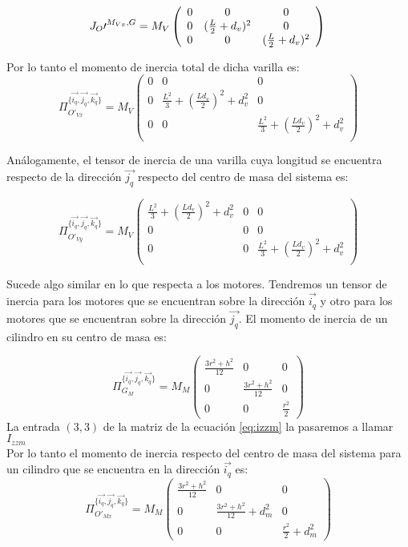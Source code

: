 $$
J_O\prime^{M_{Vx},G}= M_V \left(\begin{array}{ccc}
0  &0&  0\\
0  & (\frac{L}{2}+d_v)^2 & 0\\
0  &0 & (\frac{L}{2}+d_v)^2  \\
\end{array}\right) \\
$$

Por lo tanto el momento de inercia total de dicha varilla es:
$$
\Pi_{O\prime_{Vx}}^{\{\vec{i_q}, \vec{j_q}, \vec{k_q}\}}=M_V \left(\begin{array}{ccc}
0  &0&  0\\
0  &\frac{L^2}{3}+(\frac{Ld_v}{2})^2+d_v^2 & 0\\
0  &0 & \frac{L^2}{3}+(\frac{Ld_v}{2})^2+d_v^2  \\
\end{array}\right)$$


Análogamente, el tensor de inercia de una varilla cuya longitud se encuentra respecto de la dirección $\vec{j_q}$ respecto del centro de masa del sistema es:

$$
\Pi_{O\prime_{Vy}}^{\{\vec{i_q}, \vec{j_q}, \vec{k_q}\}}=M_V \left(\begin{array}{ccc}
\frac{L^2}{3}+(\frac{Ld_v}{2})^2+d_v^2  &0 & 0\\
0  &0 & 0\\
0  &0 & \frac{L^2}{3}+(\frac{Ld_v}{2})^2+d_v^2  \\
\end{array}\right)$$


Sucede algo similar en lo que respecta a los motores. Tendremos un tensor de inercia para los motores que se encuentran sobre la dirección $\vec{i_q}$ y otro para los motores que se encuentran sobre la dirección $\vec{j_q}$. El momento de inercia de un cilindro en su centro de masa es:

\begin{equation}
\label{eq:izzm}
\Pi_{G_{M}}^{\{\vec{i_q}, \vec{j_q}, \vec{k_q}\}}=M_M\left(\begin{array}{ccc}
\frac{3r^2+h^2}{12}  &0&  0\\
0  &\frac{3r^2+h^2}{12} & 0\\
0  &0 & \frac{r^2}{2}  
\end{array}\right)
\end{equation}
La entrada $(3,3)$ de la matriz de la ecuación \ref{eq:izzm} la pasaremos a llamar $I_{zzm}$\\

Por lo tanto el momento de inercia respecto del centro de masa del sistema para un cilindro que se encuentra en la dirección $\vec{i_q}$ es:
$$
\Pi_{O\prime_{Mx}}^{\{\vec{i_q}, \vec{j_q}, \vec{k_q}\}}=M_M\left(\begin{array}{ccc}
\frac{3r^2+h^2}{12}  &0&  0\\
0  &\frac{3r^2+h^2}{12} +d_m^2& 0\\
0  &0 & \frac{r^2}{2}+d_m^2  
\end{array}\right)
$$


